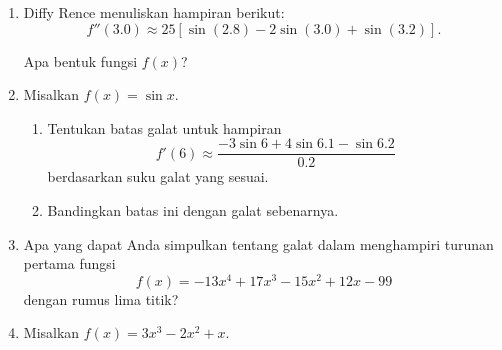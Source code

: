 \begin{small}
\begin{enumerate}
\begin{enumerate}
\item \label{exc:calculusErrors-25}${\displaystyle f'(x_{0})\approx\frac{f(x_{0}+2h)-f(x_{0})}{2h}}$ \hasananswer 
\item ${\displaystyle f'(x_{0})\approx\frac{f(x_{0}+2h)-f(x_{0}-h)}{3h}}$
\item \label{exc:calculusErrors-12}${\displaystyle f'(x_{0})\approx\frac{-3f(x_{0})+4f(x_{0}+\frac{h}{2})-f(x_{0}+h)}{h}}$ \hasasolution 
\item ${\displaystyle f'(x_{0})\approx\frac{-13f(x_{0}-10h)-12f(x_{0}+5h)+25f(x_{0}+8h)}{270h}}$
\item \label{exc:calculusErrors-26}${\displaystyle f'(x_{0})\approx\frac{-7f(x_{0}+h)+416f(x_{0}+\frac{1}{2}h)-2916f(x_{0}+\frac{1}{3}h)+5632f(x_{0}+\frac{1}{4}h)-3125f(x_{0}+\frac{1}{5}h)}{12h}}$ \hasananswer 
\item ${\displaystyle f''(x_{0})\approx\frac{2f(x_{0}-h)-3f(x_{0})+f(x_{0}+2h)}{3h^{2}}}$
\item \label{exc:calculusErrors-27}${\displaystyle f''(x_{0})\approx\frac{7f(x_{0}-5h)-12f(x_{0})+5f(x_{0}+7h)}{210h^{2}}}$ \hasananswer 
\item ${\displaystyle f''(x_{0})\approx\frac{5f(x_{0}-5h)-12f(x_{0}+2h)+7f(x_{0}+7h)}{210h^{2}}}$
\item \label{exc:calculusErrors-28}${\displaystyle f''(x_{0})\approx\frac{5f(x_{0}-2h)+32f(x_{0}-h)-60f(x_{0})+25f(x_{0}+2h)-2f(x_{0}+4h)}{60h^{2}}}$ \hasananswer 
\end{enumerate}
\item \label{exc:calculusErrors-17}Diffy Rence menuliskan hampiran berikut:
\[
f''(3.0)\approx25[\sin(2.8)-2\sin(3.0)+\sin(3.2)].
\]

Apa bentuk fungsi $f(x)$? \hasasolution 
\item Misalkan $f(x)=\sin x$. 

\begin{enumerate}
\item Tentukan batas galat untuk hampiran 
\[
f'(6)\approx\frac{-3\sin6+4\sin6.1-\sin6.2}{0.2}
\]
 berdasarkan suku galat yang sesuai.
\item Bandingkan batas ini dengan galat sebenarnya.
\end{enumerate}
\item Apa yang dapat Anda simpulkan tentang galat dalam menghampiri turunan
pertama fungsi 
\[
f(x)=-13x^{4}+17x^{3}-15x^{2}+12x-99
\]
dengan rumus lima titik?
\item Misalkan $f(x)=3x^{3}-2x^{2}+x$.


\end{enumerate}
\end{small}
